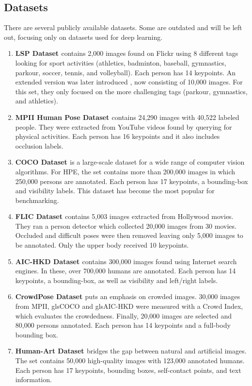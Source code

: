 \subsection{Datasets}
There are several publicly available datasets.
Some are outdated and will be left out, focusing only on datasets used for deep learning.

\begin{enumerate}
	\item \textbf{\gls{LSP} Dataset \cite{Johnson2010}} contains 2,000 images found on Flickr using 8 different tags looking for sport activities (athletics, badminton, baseball, gymnastics, parkour, soccer, tennis, and volleyball).
	Each person has 14 keypoints.
	An extended version was later introduced \cite{Johnson2011}, now consisting of 10,000 images. 
	For this set, they only focused on the more challenging tags (parkour, gymnastics, and athletics).
	\item \textbf{\gls{MPII} Human Pose Dataset \cite{Andriluka2014}} contains 24,290 images with 40,522 labeled people.
	They were extracted from YouTube videos found by querying for physical activities.
	Each person has 16 keypoints and it also includes occlusion labels.
	\item \textbf{\gls{COCO} Dataset \cite{Lin2014}} is a large-scale dataset for a wide range of computer vision algorithms.
	For HPE, the set contains more than 200,000 images in which 250,000 persons are annotated.
	Each person has 17 keypoints, a bounding-box and visibility labels.
	This dataset has become the most popular for benchmarking.
	\item \textbf{\gls{FLIC} Dataset \cite{Sap2013}} contains 5,003 images extracted from Hollywood movies.
	They ran a person detector which collected 20,000 images from 30 movies.
	Occluded and difficult poses were then removed leaving only 5,000 images to be annotated.
	Only the upper body received 10 keypoints.
	\item \textbf{\gls{AIC-HKD} Dataset \cite{Sap2013}} contains 300,000 images found using Internet search engines.
	In these, over 700,000 humans are annotated.
	Each person has 14 keypoints, a bounding-box, as well as visibility and left/right labels.
	\item \textbf{CrowdPose Dataset \cite{Li2018}} puts an emphasis on crowded images.
	30,000 images from \gls{MPII}, gls{COCO} and gls{AIC-HKD} were measured with a Crowd Index, which evaluates the crowdedness.
	Finally, 20,000 images are selected and 80,000 persons annotated.
	Each person has 14 keypoints and a full-body bounding box.
	\item \textbf{Human-Art Dataset \cite{Ju2023}} bridges the gap between natural and artificial images.
	The set contains 50,000 high-quality images with 123,000 annotated humans.
	Each person has 17 keypoints, bounding boxes, self-contact points, and text information.
\end{enumerate}

